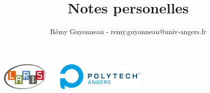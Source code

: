 \documentclass{notebook} %
\title{Notes personelles}
\author{Rémy Guyonneau - remy.guyonneau@univ-angers.fr}
\begin{document}
\begin{center}
    \includegraphics[height=50px]{images/laris.png}  ~~~ \includegraphics[height=50px]{images/Polytech_HORIZ_angers.png} \\
\end{center}

\maketitle

\tableofcontents




% 



\end{document}
